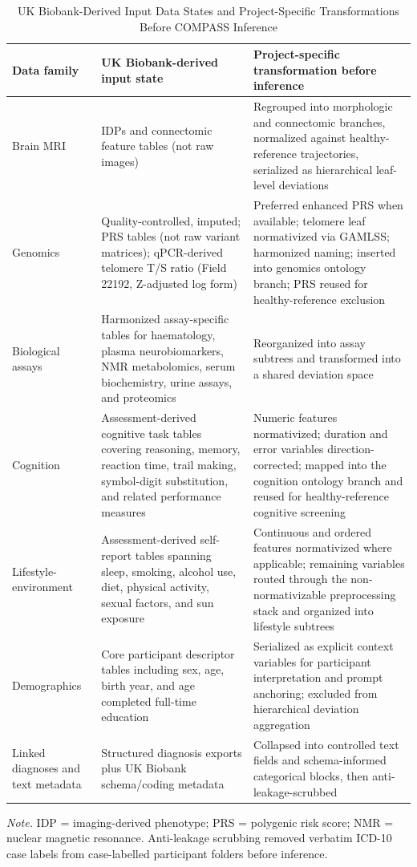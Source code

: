 \documentclass[11pt,a4paper,twoside]{article}
\begin{document}
\begin{table}[H]
\caption{UK Biobank-Derived Input Data States and Project-Specific Transformations Before COMPASS Inference}
\label{tab:s8}
\footnotesize
\begin{tabularx}{\linewidth}{l X X}
\toprule
Data family & UK Biobank-derived input state & Project-specific transformation before inference \\
\midrule
Brain MRI & IDPs and connectomic feature tables (not raw images) & Regrouped into morphologic and connectomic branches, normalized against healthy-reference trajectories, serialized as hierarchical leaf-level deviations \\
Genomics & Quality-controlled, imputed; PRS tables (not raw variant matrices); qPCR-derived telomere T/S ratio (Field 22192, Z-adjusted log form) & Preferred enhanced PRS when available; telomere leaf normativized via GAMLSS; harmonized naming; inserted into genomics ontology branch; PRS reused for healthy-reference exclusion \\
Biological assays & Harmonized assay-specific tables for haematology, plasma neurobiomarkers, NMR metabolomics, serum biochemistry, urine assays, and proteomics & Reorganized into assay subtrees and transformed into a shared deviation space \\
Cognition & Assessment-derived cognitive task tables covering reasoning, memory, reaction time, trail making, symbol-digit substitution, and related performance measures & Numeric features normativized; duration and error variables direction-corrected; mapped into the cognition ontology branch and reused for healthy-reference cognitive screening \\
Lifestyle-environment & Assessment-derived self-report tables spanning sleep, smoking, alcohol use, diet, physical activity, sexual factors, and sun exposure & Continuous and ordered features normativized where applicable; remaining variables routed through the non-normativizable preprocessing stack and organized into lifestyle subtrees \\
Demographics & Core participant descriptor tables including sex, age, birth year, and age completed full-time education & Serialized as explicit context variables for participant interpretation and prompt anchoring; excluded from hierarchical deviation aggregation \\
Linked diagnoses and text metadata & Structured diagnosis exports plus UK Biobank schema/coding metadata & Collapsed into controlled text fields and schema-informed categorical blocks, then anti-leakage-scrubbed \\
\bottomrule
\end{tabularx}
\par\smallskip\noindent\small\textit{Note.} IDP = imaging-derived phenotype; PRS = polygenic risk score; NMR = nuclear magnetic resonance. Anti-leakage scrubbing removed verbatim ICD-10 case labels from case-labelled participant folders before inference.
\end{table}
\end{document}
